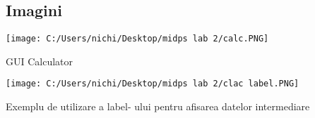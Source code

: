 \subsection{Imagini}

\texttt{[image: C:/Users/nichi/Desktop/midps lab 2/calc.PNG]}


	GUI Calculator


\texttt{[image: C:/Users/nichi/Desktop/midps lab 2/clac label.PNG]}

	Exemplu de utilizare a label- ului pentru afisarea datelor intermediare




